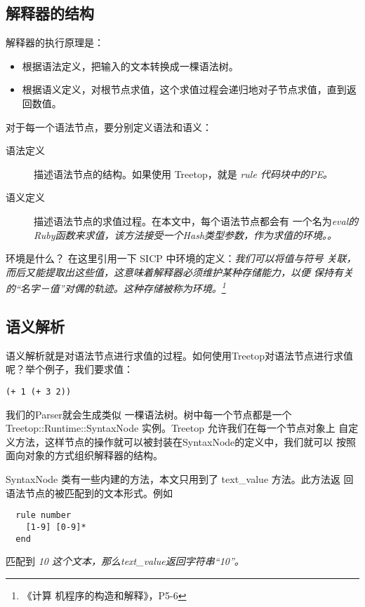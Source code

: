 \documentclass{article}
\begin{document}
\subsection{解释器的结构}

解释器的执行原理是：
\begin{itemize}
\item 根据语法定义，把输入的文本转换成一棵语法树。
\item 根据语义定义，对根节点求值，这个求值过程会递归地对子节点求值，直到返回数值。
\end{itemize}

对于每一个语法节点，要分别定义语法和语义：
\begin{description}
  \item[语法定义] 描述语法节点的结构。如果使用 Treetop，就是 \em{rule} 代码块中的PE。
  \item[语义定义] 描述语法节点的求值过程。在本文中，每个语法节点都会有
    一个名为\em{eval}的Ruby函数来求值，该方法接受一个Hash类型参数，作为求值的环境。。
\end{description}

环境是什么？ 在这里引用一下 SICP 中环境的定义：\em{我们可以将值与符号
  关联，而后又能提取出这些值，这意味着解释器必须维护某种存储能力，以便
  保持有关的“名字－值”对偶的轨迹。这种存储被称为环境。}\footnote{《计算
    机程序的构造和解释》，P5-6}
\subsection{语义解析}
语义解析就是对语法节点进行求值的过程。如何使用Treetop对语法节点进行求值呢？举个例子，我们要求值：
\begin{verbatim}
(+ 1 (+ 3 2))
\end{verbatim}
我们的Parser就会生成类似  一棵语法树。树中每一个节点都是一个
Treetop::Runtime::SyntaxNode 实例。Treetop 允许我们在每一个节点对象上
自定义方法，这样节点的操作就可以被封装在SyntaxNode的定义中，我们就可以
按照面向对象的方式组织解释器的结构。

SyntaxNode 类有一些内建的方法，本文只用到了 text\_value 方法。此方法返
回语法节点的被匹配到的文本形式。例如
\begin{verbatim}
  rule number
    [1-9] [0-9]*
  end
\end{verbatim}
匹配到 \em{10} 这个文本，那么text\_value返回字符串“10”。
\end{document}
